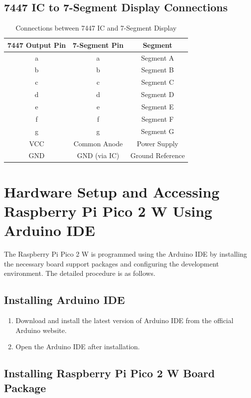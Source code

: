 \documentclass[12pt,a4paper]{article}
\begin{document}
\subsection{7447 IC to 7-Segment Display Connections}

\begin{table}[h!]
\centering
\renewcommand{\arraystretch}{1.3}
\begin{tabular}{|c|c|c|}
\hline
\textbf{7447 Output Pin} & \textbf{7-Segment Pin} & \textbf{Segment} \\
\hline
a & a & Segment A \\
\hline
b & b & Segment B \\
\hline
c & c & Segment C \\
\hline
d & d & Segment D \\
\hline
e & e & Segment E \\
\hline
f & f & Segment F \\
\hline
g & g & Segment G \\
\hline
VCC & Common Anode & Power Supply \\
\hline
GND & GND (via IC) & Ground Reference \\
\hline
\end{tabular}
\caption{Connections between 7447 IC and 7-Segment Display}
\end{table}
\section{Hardware Setup and Accessing Raspberry Pi Pico 2 W Using Arduino IDE}

The Raspberry Pi Pico 2 W is programmed using the Arduino IDE by installing the necessary board support packages and configuring the development environment. The detailed procedure is as follows.



\subsection{Installing Arduino IDE}

\begin{enumerate}
    \item Download and install the latest version of Arduino IDE from the official Arduino website.
    \item Open the Arduino IDE after installation.
\end{enumerate}

\subsection{Installing Raspberry Pi Pico 2 W Board Package}
\end{document}

